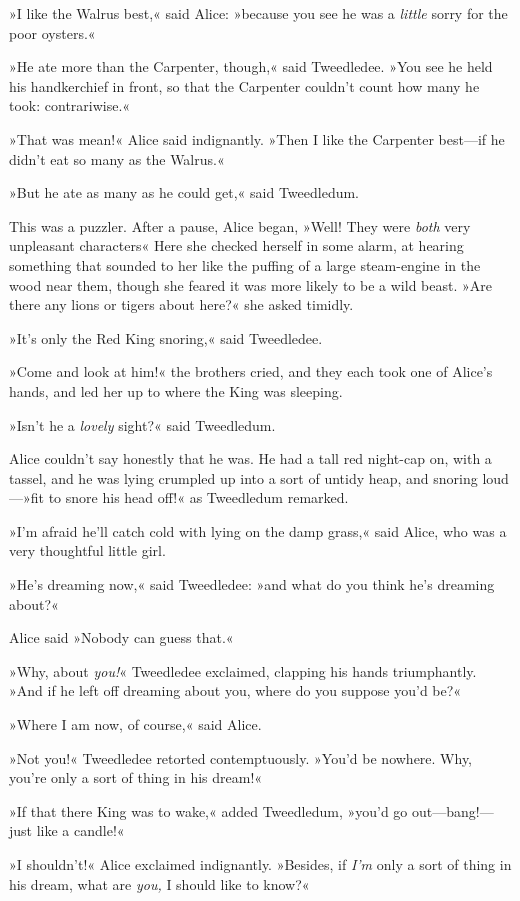 »I like the Walrus best,« said Alice: »because you see he was a \textit{little} sorry for the poor oysters.«

»He ate more than the Carpenter, though,« said Tweedledee. »You see he held his handkerchief in front, so that the Carpenter couldn't count how many he took: contrariwise.«

»That was mean!« Alice said indignantly. »Then I like the Carpenter best—if he didn't eat so many as the Walrus.«

»But he ate as many as he could get,« said Tweedledum.

This was a puzzler. After a pause, Alice began, »Well! They were \textit{both} very unpleasant characters\longdash« Here she checked herself in some alarm, at hearing something that sounded to her like the puffing of a large steam-engine in the wood near them, though she feared it was more likely to be a wild beast. »Are there any lions or tigers about here?« she asked timidly.

»It's only the Red King snoring,« said Tweedledee.

»Come and look at him!« the brothers cried, and they each took one of Alice's hands, and led her up to where the King was sleeping.

»Isn't he a \textit{lovely} sight?« said Tweedledum.

Alice couldn't say honestly that he was. He had a tall red night-cap on, with a tassel, and he was lying crumpled up into a sort of untidy heap, and snoring loud—»fit to snore his head off!« as Tweedledum remarked.

»I'm afraid he'll catch cold with lying on the damp grass,« said Alice, who was a very thoughtful little girl.

»He's dreaming now,« said Tweedledee: »and what do you think he's dreaming about?«

Alice said »Nobody can guess that.«

»Why, about \textit{you!}« Tweedledee exclaimed, clapping his hands triumphantly. »And if he left off dreaming about you, where do you suppose you'd be?«

»Where I am now, of course,« said Alice.

»Not you!« Tweedledee retorted contemptuously. »You'd be nowhere. Why, you're only a sort of thing in his dream!«

»If that there King was to wake,« added Tweedledum, »you'd go out—bang!—just like a candle!«

»I shouldn't!« Alice exclaimed indignantly. »Besides, if \textit{I'm} only a sort of thing in his dream, what are \textit{you,} I should like to know?«

